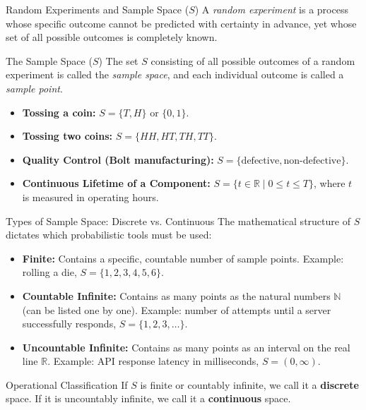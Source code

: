 \documentclass[10pt,aspectratio=169]{beamer}
\begin{document}
\begin{frame}{Random Experiments and Sample Space ($S$)}
  A \emph{random experiment} is a process whose specific outcome cannot be predicted with certainty in advance, yet whose set of all possible outcomes is completely known. \pause

  \vspace{0.3em}
  \begin{block}{The Sample Space ($S$)}
    The set $S$ consisting of all possible outcomes of a random experiment is called the \emph{sample space}, and each individual outcome is called a \emph{sample point}.
  \end{block}

  \vspace{0.3em}
  \pause
  \begin{itemize}
    \item \textbf{Tossing a coin:} $S = \{T, H\}$ or $\{0, 1\}$. \pause
    \item \textbf{Tossing two coins:} $S = \{HH, HT, TH, TT\}$. \pause
    \item \textbf{Quality Control (Bolt manufacturing):} $S = \{\text{defective}, \text{non-defective}\}$. \pause
    \item \textbf{Continuous Lifetime of a Component:} $S = \{t \in \mathbb{R} \mid 0 \leq t \leq T\}$, where $t$ is measured in operating hours.
  \end{itemize}
\end{frame}

\begin{frame}{Types of Sample Space: Discrete vs. Continuous}
  The mathematical structure of $S$ dictates which probabilistic tools must be used: \pause

  \vspace{0.4em}
  \begin{itemize}
    \item \textbf{Finite:} Contains a specific, countable number of sample points. Example: rolling a die, $S = \{1, 2, 3, 4, 5, 6\}$. \pause
    \item \textbf{Countable Infinite:} Contains as many points as the natural numbers $\mathbb{N}$ (can be listed one by one). Example: number of attempts until a server successfully responds, $S = \{1, 2, 3, \dots\}$. \pause
    \item \textbf{Uncountable Infinite:} Contains as many points as an interval on the real line $\mathbb{R}$. Example: API response latency in milliseconds, $S = (0, \infty)$.
  \end{itemize}

  \vspace{0.4em}
  \pause
  \begin{alertblock}{Operational Classification}
    If $S$ is finite or countably infinite, we call it a \textbf{discrete} space. If it is uncountably infinite, we call it a \textbf{continuous} space.
  \end{alertblock}
\end{frame}
\end{document}
